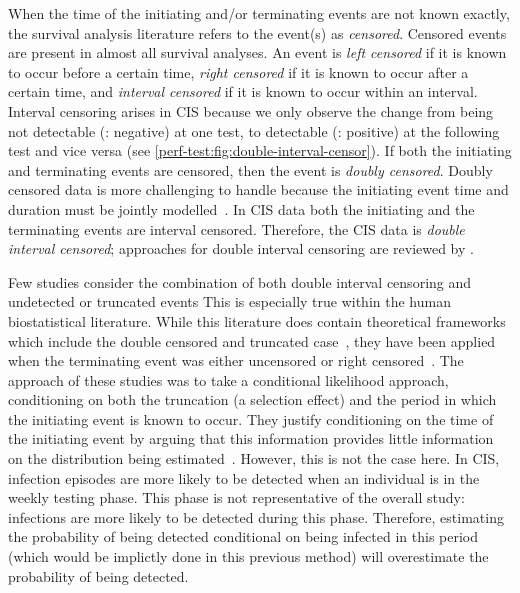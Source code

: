\documentclass[thesis.tex]{subfiles}
\begin{document}
When the time of the initiating and/or terminating events are not known exactly, the survival analysis literature refers to the event(s) as \emph{censored}.
Censored events are present in almost all survival analyses.
An event is \emph{left censored} if it is known to occur before a certain time, \emph{right censored} if it is known to occur after a certain time, and \emph{interval censored} if it is known to occur within an interval.
Interval censoring arises in CIS because we only observe the change from being not detectable (\ie: negative) at one test, to detectable (\ie: positive) at the following test and vice versa (see \cref{perf-test:fig:double-interval-censor}).
If both the initiating and terminating events are censored, then the event is \emph{doubly censored}.
Doubly censored data is more challenging to handle because the initiating event time and duration must be jointly modelled~\autocite[and references therein]{liSemiparametric}.
In CIS data both the initiating and the terminating events are interval censored.
Therefore, the CIS data is \emph{double interval censored}; approaches for double interval censoring are reviewed by \textcite{sunAnalysis,bogaertsSurvival}.

Few studies consider the combination of both double interval censoring and undetected or truncated events
This is especially true within the human biostatistical literature.
While this literature does contain theoretical frameworks which include the double censored and truncated case~\autocites{turnbullEmpirical}{dempsterMaximum}, they have been applied when the terminating event was either uncensored or right censored~\autocite{sunEmpirical,bacchettiNonparametric}.
The approach of these studies \autocite[and elsewhere, e.g.:][]{shenNonparametric} was to take a conditional likelihood approach, conditioning on both the truncation (a selection effect) and the period in which the initiating event is known to occur.
They justify conditioning on the time of the initiating event by arguing that this information provides little information on the distribution being estimated~.
However, this is not the case here.
In CIS, infection episodes are more likely to be detected when an individual is in the weekly testing phase.
This phase is not representative of the overall study: infections are more likely to be detected during this phase.
Therefore, estimating the probability of being detected conditional on being infected in this period (which would be implictly done in this previous method)  will overestimate the probability of being detected.
\end{document}
